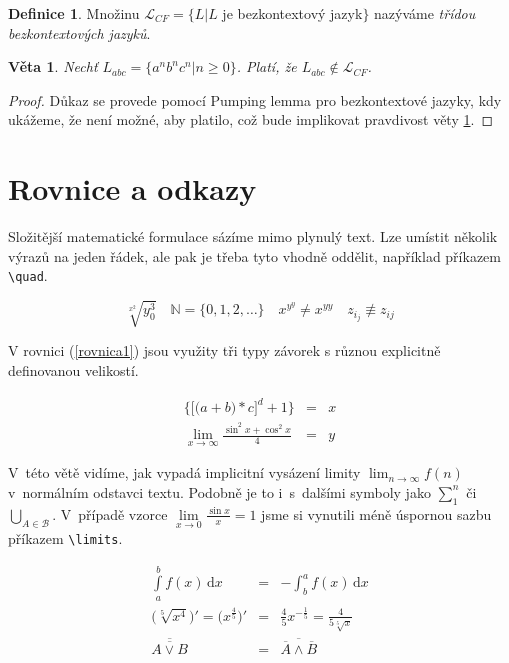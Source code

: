 \documentclass[a4paper,11pt,twocolumn,titlepage]{article}
\theoremstyle{definition}
\newtheorem{definition}{Definice}[section]
\theoremstyle{plain}
\newtheorem{lemma}{Věta}
\begin{document}
\begin{definition}
Množinu $\mathcal{L}_{CF}=\{L|L$ je bezkontextový jazyk$\}$ nazýváme \emph{třídou bezkontextových jazyků}.
\end{definition}

\begin{lemma}
	\label{veta1} Nechť $L_{abc}=\{a^nb^nc^n|n\geq 0\}$. Platí, že $L_{abc}\notin \mathcal{L}_{CF}$.
\end{lemma}

\begin{proof}
Důkaz se provede pomocí Pumping lemma pro bezkontextové jazyky, kdy ukážeme, že není možné, aby platilo, což bude implikovat pravdivost věty \ref{veta1}.
\end{proof}

\section{Rovnice a odkazy}

Složitější matematické formulace sázíme mimo plynulý text. Lze umístit několik výrazů na jeden řádek, ale pak je třeba tyto vhodně oddělit, například příkazem \verb|\quad|. 

$$\sqrt[x^2]{y^3_0} \quad \mathbb{N}=\{\mathrm{0,1,2,\dots}\} \quad x^{y^y}\neq x^{yy} \quad z_{i_j}\not \equiv z_{ij}$$

V rovnici (\ref{rovnica1}) jsou využity tři typy závorek s různou explicitně definovanou velikostí.

\setcounter{equation}{0}
\begin{eqnarray}
	\label{rovnica1}
		\bigg\{ \Big[ \big(a+b \big) *c \Big] ^d+1 \bigg\} &=&x \\
	\lim_{x\to\infty} \frac{\sin ^2x+ \cos ^2x}{4} &=&y \nonumber
\end{eqnarray}

V~této větě vidíme, jak vypadá implicitní vysázení limity $\lim_{n\to\infty} f(n)$ v~normálním odstavci textu. Podobně je to i~s~dalšími symboly jako $\sum^n_1$ či $\bigcup_{A \in \mathcal{B}}$. V~případě vzorce $\lim\limits_{x\to 0}\frac{\sin x}{x}=1$ jsme si vynutili méně úspornou sazbu příkazem \verb|\limits|.

\begin{eqnarray}
	\int \limits _a^b f(x)\,\mathrm{d}x &=& -\int_b^a f(x)\,\mathrm{d}x \\
	\Big( \sqrt[5]{x^4} \Big)' = \Big( x^{\frac{4}{5}}\Big)' &=& \frac{4}{5}x^{-\frac{1}{5}} = \frac{4}{5\sqrt[5]{x}} \\
	\overline{\overline{A\vee B}} &=& \overline{\overline{A} \wedge \overline{B}}
\end{eqnarray}
\end{document}

